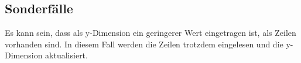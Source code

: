 %
%

\subsection{Sonderfälle}\label{subsec:sonderfaelle}
Es kann sein, dass als y-Dimension ein geringerer Wert eingetragen ist, als Zeilen vorhanden sind.
In diesem Fall werden die Zeilen trotzdem eingelesen und die y-Dimension aktualisiert.